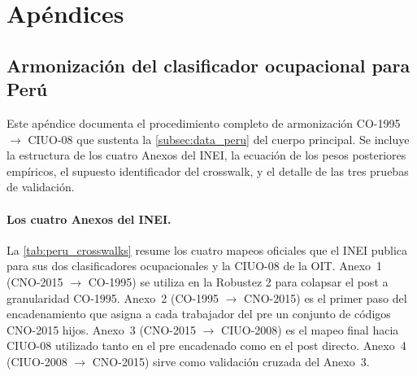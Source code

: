 \appendix
\section{Ap\'{e}ndices}
\label{sec:appendices}


\subsection{Armonizaci\'{o}n del clasificador ocupacional para Per\'{u}}
\label{app:peru_imputation}

Este ap\'{e}ndice documenta el procedimiento completo de armonizaci\'{o}n CO-1995 $\to$ CIUO-08 que sustenta la \cref{subsec:data_peru} del cuerpo principal. Se incluye la estructura de los cuatro Anexos del INEI, la ecuaci\'{o}n de los pesos posteriores emp\'{i}ricos, el supuesto identificador del crosswalk, y el detalle de las tres pruebas de validaci\'{o}n.

\paragraph{Los cuatro Anexos del INEI.} La \cref{tab:peru_crosswalks} resume los cuatro mapeos oficiales que el INEI publica para sus dos clasificadores ocupacionales y la CIUO-08 de la OIT. Anexo~1 (CNO-2015 $\to$ CO-1995) se utiliza en la Robustez 2 para colapsar el post a granularidad CO-1995. Anexo~2 (CO-1995 $\to$ CNO-2015) es el primer paso del encadenamiento que asigna a cada trabajador del pre un conjunto de c\'{o}digos CNO-2015 hijos. Anexo~3 (CNO-2015 $\to$ CIUO-2008) es el mapeo final hacia CIUO-08 utilizado tanto en el pre encadenado como en el post directo. Anexo~4 (CIUO-2008 $\to$ CNO-2015) sirve como validaci\'{o}n cruzada del Anexo~3.

